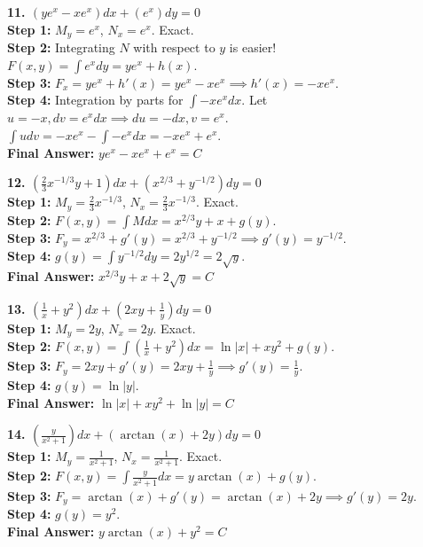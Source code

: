 \documentclass[11pt]{article}
\begin{document}
\textbf{11. $(y e^x - x e^x)dx + (e^x)dy = 0$} \\
\textbf{Step 1:} $M_y = e^x$, $N_x = e^x$. Exact. \\
\textbf{Step 2:} Integrating $N$ with respect to $y$ is easier! $F(x,y) = \int e^x dy = y e^x + h(x)$. \\
\textbf{Step 3:} $F_x = y e^x + h'(x) = y e^x - x e^x \implies h'(x) = -x e^x$. \\
\textbf{Step 4:} Integration by parts for $\int -x e^x dx$. Let $u = -x, dv = e^x dx \implies du = -dx, v = e^x$. \\
$\int u dv = -xe^x - \int -e^x dx = -x e^x + e^x$. \\
\textbf{Final Answer:} $y e^x - x e^x + e^x = C$

\textbf{12. $(\frac{2}{3}x^{-1/3} y + 1)dx + (x^{2/3} + y^{-1/2})dy = 0$} \\
\textbf{Step 1:} $M_y = \frac{2}{3}x^{-1/3}$, $N_x = \frac{2}{3}x^{-1/3}$. Exact. \\
\textbf{Step 2:} $F(x,y) = \int M dx = x^{2/3} y + x + g(y)$. \\
\textbf{Step 3:} $F_y = x^{2/3} + g'(y) = x^{2/3} + y^{-1/2} \implies g'(y) = y^{-1/2}$. \\
\textbf{Step 4:} $g(y) = \int y^{-1/2} dy = 2y^{1/2} = 2\sqrt{y}$. \\
\textbf{Final Answer:} $x^{2/3} y + x + 2\sqrt{y} = C$

\textbf{13. $(\frac{1}{x} + y^2)dx + (2xy + \frac{1}{y})dy = 0$} \\
\textbf{Step 1:} $M_y = 2y$, $N_x = 2y$. Exact. \\
\textbf{Step 2:} $F(x,y) = \int (\frac{1}{x} + y^2)dx = \ln|x| + xy^2 + g(y)$. \\
\textbf{Step 3:} $F_y = 2xy + g'(y) = 2xy + \frac{1}{y} \implies g'(y) = \frac{1}{y}$. \\
\textbf{Step 4:} $g(y) = \ln|y|$. \\
\textbf{Final Answer:} $\ln|x| + xy^2 + \ln|y| = C$

\textbf{14. $(\frac{y}{x^2+1})dx + (\arctan(x) + 2y)dy = 0$} \\
\textbf{Step 1:} $M_y = \frac{1}{x^2+1}$, $N_x = \frac{1}{x^2+1}$. Exact. \\
\textbf{Step 2:} $F(x,y) = \int \frac{y}{x^2+1} dx = y \arctan(x) + g(y)$. \\
\textbf{Step 3:} $F_y = \arctan(x) + g'(y) = \arctan(x) + 2y \implies g'(y) = 2y$. \\
\textbf{Step 4:} $g(y) = y^2$. \\
\textbf{Final Answer:} $y \arctan(x) + y^2 = C$
\end{document}
